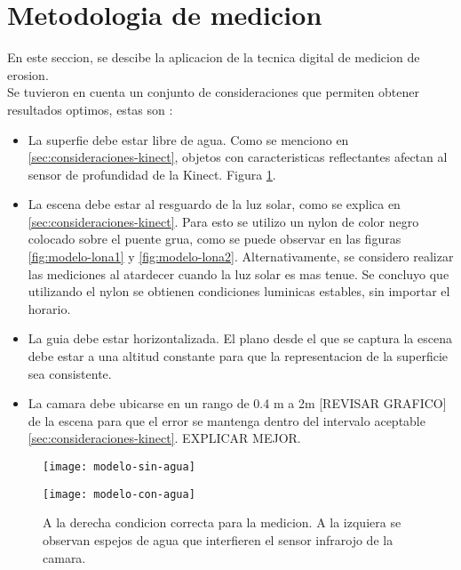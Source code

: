 
\section{Metodologia de medicion}

En este seccion, se descibe la aplicacion de la tecnica digital de medicion de erosion. \\

Se tuvieron en cuenta un conjunto de consideraciones que permiten obtener resultados optimos, estas son :

\begin{itemize}

\item La superfie debe estar libre de agua. Como se menciono en \ref{sec:consideraciones-kinect}, objetos con caracteristicas reflectantes afectan al sensor de profundidad de la Kinect. Figura \ref{fig:modelo-condiciones-agua}.

\item La escena debe estar al resguardo de la luz solar, como se explica en \ref{sec:consideraciones-kinect}. Para esto se utilizo un nylon de color negro colocado sobre el puente grua, como se puede observar en las figuras \ref{fig:modelo-lona1} y \ref{fig:modelo-lona2}. Alternativamente, se considero realizar las mediciones al atardecer cuando la luz solar es mas tenue. Se concluyo que utilizando el nylon se obtienen condiciones luminicas estables, sin importar el horario.

\item La guia debe estar horizontalizada. El plano desde el que se captura la escena debe estar a una altitud constante para que la representacion de la superficie sea consistente.

\item La camara debe ubicarse en un rango de 0.4 m a 2m [REVISAR GRAFICO] de la escena para que el error se mantenga dentro del intervalo aceptable \ref{sec:consideraciones-kinect}. EXPLICAR MEJOR.

\end{itemize}

\begin{figure}[h]
\centering
\begin{minipage}[t]{.45\textwidth}
\begin{center}
\texttt{[image: modelo-sin-agua]} %
\end{center}
\end{minipage}
\hfill
\begin{minipage}[t]{.45\textwidth}
\begin{center}
\texttt{[image: modelo-con-agua]} %
\end{center}
\end{minipage}
\hfill
\caption{A la derecha condicion correcta para la medicion. A la izquiera se observan espejos de agua que interfieren el sensor infrarojo de la camara.}
\label{fig:modelo-condiciones-agua}
\end{figure}

